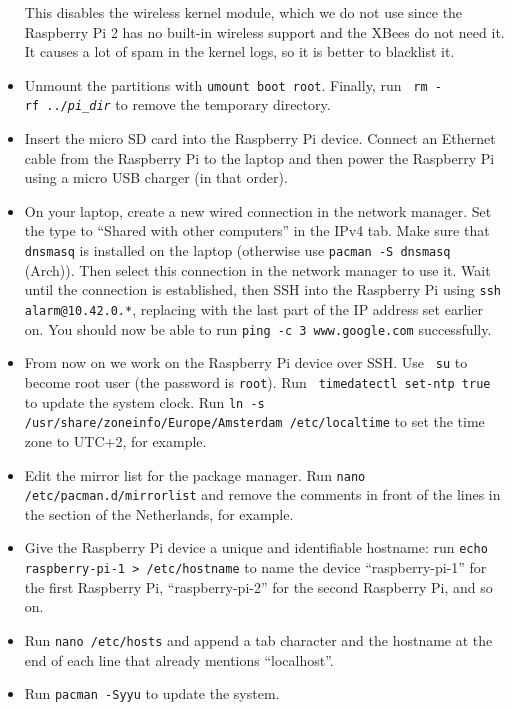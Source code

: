 \documentclass{article}
\newcommand{\arch}{{\color{red} (Arch)}}
\begin{document}
\begin{itemize}
          This disables the wireless kernel module, which we do not use since 
          the Raspberry Pi 2 has no built-in wireless support and the XBees do 
          not need it. It causes a lot of spam in the kernel logs, so it is 
          better to blacklist it.
    \item Unmount the partitions with {\tt umount boot root}. Finally, run {\tt 
          rm -rf~../\emph{pi\_dir}} to remove the temporary directory.
    \item Insert the micro SD card into the Raspberry Pi device. Connect an 
          Ethernet cable from the Raspberry Pi to the laptop and then power the 
          Raspberry Pi using a micro USB charger (in that order).
    \item On your laptop, create a new wired connection in the network manager.  
          Set the type to ``Shared with other computers'' in the IPv4 tab. Make 
          sure that {\tt dnsmasq} is installed on the laptop (otherwise use 
          {\tt pacman -S dnsmasq} \arch{}). Then select this connection in the 
          network manager to use it. Wait until the connection is established, 
          then SSH into the Raspberry Pi using {\tt ssh alarm@10.42.0.*}, 
          replacing {\tt *} with the last part of the IP address set earlier 
          on. You should now be able to run {\tt ping -c 3 www.google.com} 
          successfully.
    \item From now on we work on the Raspberry Pi device over SSH\@. Use {\tt 
          su} to become root user (the password is {\tt root}). Run {\tt 
          timedatectl set-ntp true} to update the system clock. Run {\tt ln -s 
          /usr/share/zoneinfo/Europe/Amsterdam /etc/localtime} to set the time 
          zone to UTC+2, for example.
    \item Edit the mirror list for the package manager. Run {\tt nano 
          /etc/pacman.d/mirrorlist} and remove the comments in front of the 
          lines in the section of the Netherlands, for example.
    \item Give the Raspberry Pi device a unique and identifiable hostname: run 
          {\tt echo raspberry-pi-1 > /etc/hostname} to name the device 
          ``raspberry-pi-1'' for the first Raspberry Pi, ``raspberry-pi-2'' for 
          the second Raspberry Pi, and so on.
    \item Run {\tt nano /etc/hosts} and append a tab character and the hostname 
          at the end of each line that already mentions ``localhost''.
    \item Run {\tt pacman -Syyu} to update the system.

\end{itemize}
\end{document}
